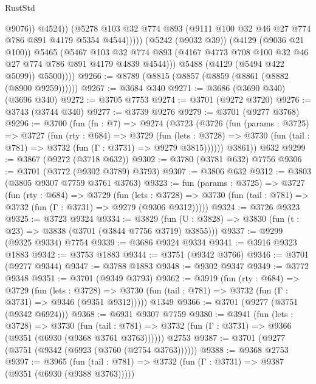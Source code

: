 \begin{lexlean}{RustStd}
\begin{coremodule}
                            @9076))
                        @4524))
                    (@5278
                      @103
                      @32
                      @774
                      @893
                      (@9111 @100 @32 @46 @27 @774 @786 @891 @4179 @5354 @4544)))))
              (@5242 (@9032 @39))
              (@4129 (@9036 @21 @100))
              @5465
              (@5467
                @103
                @32
                @774
                @893
                (@4167 @4773 @708 @100 @32 @46 @27 @774 @786 @891 @4179 @4839 @4544)))
            @5488
            (@4129 (@5494 @422 @5099))
            @5500))))
@9266 := @8789 (@8815 (@8857 (@8859 (@8861 (@8882 (@8900 @9259))))))
@9267 := @3684 @340
@9271 := @3686 (@3690 @340) (@3696 @340)
@9272 := @3705 @7753
@9274 := @3701 (@9272 @3720)
@9276 := @3743 (@3744 @340)
@9277 := @3739 @9276
@9279 := @3701 (@9277 @3768)
@9296 := @3700
    (fun (fn : @7) =>
    @9274
      (@3723
        (@3726
          (fun (params : @3725) =>
          @3727
            (fun (rty : @684) =>
            @3729
              (fun (lets : @3728) =>
              @3730 (fun (tail : @781) => @3732 (fun (Γ : @3731) => @9279 @3815))))))
        @3861))
    @632
@9299 := @3867 (@9272 (@3718 @632))
@9302 := @3780 (@3781 @632) @7756
@9306 := @3701 (@3772 (@9302 @3789) @3793)
@9307 := @3806 @632
@9312 := @3803 (@3805 @9307 @7759 @3761 @3763)
@9323 := fun (params : @3725) =>
  @3727
    (fun (rty : @684) =>
    @3729
      (fun (lets : @3728) =>
      @3730 (fun (tail : @781) => @3732 (fun (Γ : @3731) => @9279 (@9306 @9312)))))
@9324 := @3726 @9323
@9325 := @3723 @9324
@9334 := @3829 (fun (U : @3828) => @3830 (fun (t : @23) => @3838 (@3701 (@3844 @7756 @3719) @3855)))
@9337 := @9299 (@9325 @9334) @7754
@9339 := @3686 @9324 @9334
@9341 := @3916 @9323 @1883
@9342 := @3753 @1883
@9344 := @3751 (@9342 @3766)
@9346 := @3701 (@9277 @9344)
@9347 := @3788 @1883
@9348 := @9302 @9347
@9349 := @3772 @9348
@9351 := @3701 (@9349 @3793)
@9362 := @3919
    (fun (rty : @684) =>
    @3729
      (fun (lets : @3728) =>
      @3730 (fun (tail : @781) => @3732 (fun (Γ : @3731) => @9346 (@9351 @9312)))))
    @1349
@9366 := @3701 (@9277 (@3751 (@9342 @6924)))
@9368 := @6931 @9307 @7759
@9380 := @3941
    (fun (lets : @3728) =>
    @3730
      (fun (tail : @781) => @3732 (fun (Γ : @3731) => @9366 (@9351 (@6930 (@9368 @3761 @3763))))))
    @2753
@9387 := @3701 (@9277 (@3751 (@9342 (@6923 (@3760 (@2754 @3763))))))
@9388 := @9368 @2753
@9397 := @3965
    (fun (tail : @781) => @3732 (fun (Γ : @3731) => @9387 (@9351 (@6930 (@9388 @3763)))))

\end{coremodule}
\end{lexlean}
